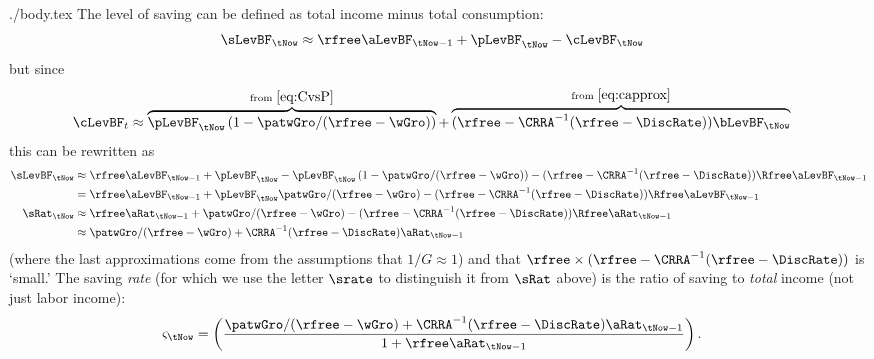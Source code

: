 \documentclass{handout}
\begin{document}
\begin{verbatimwrite}{./body.tex}
The level of saving can be defined as total income minus total consumption:
\begin{equation}\begin{gathered}\begin{aligned}
  \sLevBF_{\tNow} & \approx  \rfree \aLevBF_{\tNow-1} + \pLevBF_{\tNow} - \cLevBF_{\tNow}
\end{aligned}\end{gathered}\end{equation}
but since 
\begin{equation}\begin{gathered}\begin{aligned}
  \label{eq:cFromHandB}
  \cLevBF_{t} & \approx  \overbrace{\pLevBF_{\tNow} \left(1 - \patwGro/(\rfree - \wGro)\right)}^{\text{from }\eqref{eq:CvsP}}+\overbrace{(\rfree-\CRRA^{-1}(\rfree-\DiscRate))\bLevBF_{\tNow}}^{\text{from }\eqref{eq:capprox}}
\end{aligned}\end{gathered}\end{equation}
this can be rewritten as
\begin{equation}\begin{gathered}\begin{aligned}
 \sLevBF_{\tNow} & \approx  \rfree \aLevBF_{\tNow-1} + \pLevBF_{\tNow}- \pLevBF_{\tNow} \left(1 - \patwGro/(\rfree - \wGro)\right) - (\rfree-\CRRA^{-1}(\rfree-\DiscRate))\Rfree \aLevBF_{\tNow-1}
\\ & =  \rfree \aLevBF_{\tNow-1} + \pLevBF_{\tNow} \patwGro/(\rfree - \wGro)- (\rfree-\CRRA^{-1}(\rfree-\DiscRate))\Rfree\aLevBF_{\tNow-1}
\\ \sRat_{\tNow} & \approx  \rfree \aRat_{\tNow-1} + \patwGro/(\rfree - \wGro)- (\rfree-\CRRA^{-1}(\rfree-\DiscRate))\Rfree \aRat_{\tNow-1}
\\ & \approx  \patwGro/(\rfree - \wGro)+ \CRRA^{-1}(\rfree-\DiscRate)\aRat_{\tNow-1}
\end{aligned}\end{gathered}\end{equation}
(where the last approximations come from the assumptions that $1/G \approx 1$) and that $\rfree \times (\rfree-\CRRA^{-1}(\rfree-\DiscRate))$ is `small.'  The saving {\it rate} (for which we use the letter $\srate$ to distinguish it from $\sRat$ above) is the ratio of saving to {\it total} income (not just labor income):
\begin{equation}\begin{gathered}\begin{aligned}
\varsigma_{\tNow} & =  \left(\frac{\patwGro/(\rfree - \wGro)+ \CRRA^{-1}(\rfree-\DiscRate)\aRat_{\tNow-1}}{1+ \rfree \aRat_{\tNow-1}}\right).
\end{aligned}\end{gathered}\end{equation}


\end{verbatimwrite}
\end{document}
